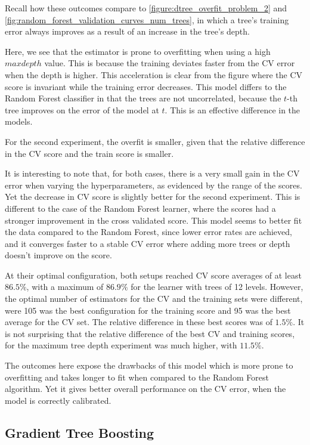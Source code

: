 Recall how these outcomes compare to \cref{figure:dtree_overfit_problem_2} and \cref{fig:random_forest_validation_curves_num_trees},
in which a tree's training error always improves as a result of an increase in the tree's depth.

Here, we see that the estimator is prone to overfitting when using a high $max depth$ value.
This is because the training deviates faster from the CV error when the depth is higher.
This acceleration is clear from the figure where the CV score is invariant while the training error decreases.
This model differs to the Random Forest classifier in that the trees are not uncorrelated, because the $t$-th tree improves on the error of the model at $t$.
This is an effective difference in the models.

For the second experiment, the overfit is smaller, given that the relative difference in the CV score and the train score is smaller.

It is interesting to note that, for both cases, there is a very small gain in the CV error when varying the hyperparameters, as evidenced by the range of the scores.
Yet the decrease in CV score is slightly better for the second experiment.
This is different to the case of the Random Forest learner, where the scores had a stronger improvement in the cross validated score.
This model seems to better fit the data compared to the Random Forest, since lower error rates are achieved, and it converges faster to a stable CV error where adding more trees or depth doesn't improve on the score.

At their optimal configuration, both setups reached CV score averages of at least $86.5\%$, with a maximum of $86.9\%$ for the learner with trees of 12 levels.
However, the optimal number of estimators for the CV and the training sets were different, were 105 was the best configuration for the training score and 95 was the best average for the CV set. The relative difference in these best scores was of $1.5\%$.
It is not surprising that the relative difference of the best CV and training scores, for the maximum tree depth experiment was much higher, with $11.5\%$.

The outcomes here expose the drawbacks of this model which is more prone to overfitting and takes longer to fit when compared to the Random Forest algorithm.
Yet it gives better overall performance on the CV error, when the model is correctly calibrated.



\subsection{Gradient Tree Boosting}

